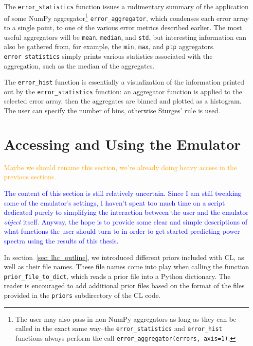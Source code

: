 
The \verb|error_statistics| function issues a rudimentary summary of the 
application of some NumPy aggregator\footnote{The user may also pass in
non-NumPy aggregators as long as they can be called in the exact same
way--the \verb|error_statistics| and \verb|error_hist| functions always
perform the call \verb|error_aggregator(errors, axis=1)|.}
\verb|error_aggregator|, which condenses each error array to a single point,
to one of the various error metrics described earlier. The 
most useful aggregators will be \verb|mean|, \verb|median|, and \verb|std|, 
but interesting information can also be gathered from, for example, the
\verb|min|, \verb|max|, and \verb|ptp| aggregators.
\verb|error_statistics| simply prints various statistics associated with the 
aggregation, such as the median of the aggregates.

The \verb|error_hist| function is essentially a visualization of the 
information printed out by the \verb|error_statistics| function: an aggregator
function is applied to the selected error array, then the aggregates are 
binned and plotted as a histogram. The user can specify the number of bins,
otherwise Sturges' rule is used.


\section{Accessing and Using the Emulator}


\textcolor{orange}{Maybe we should rename this section, we're already doing
heavy access in the previous sections.}

\textcolor{blue}{The content of this section is still relatively uncertain. 
Since I am still tweaking some of the emulator's settings, I haven't spent too 
much time on a script dedicated purely to simplifying the interaction between 
the user and the emulator \textit{object} itself. Anyway, the hope is to 
provide some clear and simple 
descriptions of what functions the user should turn to in order to get started 
predicting power spectra using the results of this thesis.}


In section~\ref{sec: lhc_outline}, we introduced different priors 
included with CL, as well as their file names. These file names come into play 
when calling the function \verb|prior_file_to_dict|, which reads a prior file
into a Python dictionary. The reader is encouraged to add additional prior
files based on the format of the files provided in the \verb|priors|
subdirectory of the CL code.

